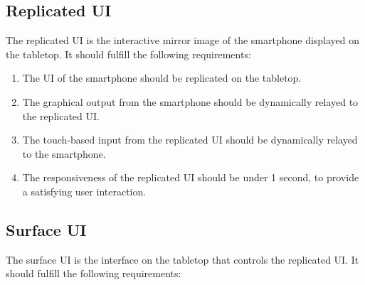 
\subsection{Replicated UI}

The replicated UI is the interactive mirror image of the smartphone displayed on the tabletop.
It should fulfill the following requirements:

\begin{enumerate}[{RB}-1]
\item The UI of the smartphone should be replicated on the tabletop.
\item The graphical output from the smartphone should be dynamically relayed to the replicated UI.
\item The touch-based input from the replicated UI should be dynamically relayed to the smartphone.
\item The responsiveness of the replicated UI should be under 1 second, to provide a satisfying user interaction.
\end{enumerate}


\subsection{Surface UI}

The surface UI is the interface on the tabletop that controls the replicated UI.
It should fulfill the following requirements:

